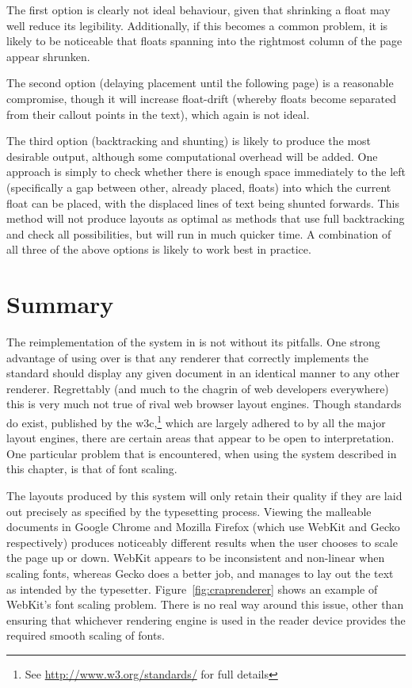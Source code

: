 The first option is clearly not ideal behaviour, given that shrinking a float may well reduce its legibility. Additionally, if this becomes a common problem, it is likely to be noticeable that floats spanning into the rightmost column of the page appear shrunken.

The second option (delaying placement until the following page) is a reasonable compromise, though it will increase float-drift (whereby floats become separated from their callout points in the text), which again is not ideal.

The third option (backtracking and shunting) is likely to produce the most desirable output, although some computational overhead will be added. One approach is simply to check whether there is enough space immediately to the left (specifically a gap between other, already placed, floats) into which the current float can be placed, with the displaced lines of text being shunted forwards. This method will not produce layouts as optimal as methods that use full backtracking and check all possibilities, but will run in much quicker time. A combination of all three of the above options is likely to work best in practice.



\section{Summary}

The reimplementation of the system in \html{} is not without its pitfalls. One strong advantage of using \pdf{} over \html{} is that any \pdf{} renderer that correctly implements the standard\hspace{0pt}\cite{ASI2001} should display any given document in an identical manner to any other renderer. Regrettably (and much to the chagrin of web developers everywhere) this is very much not true of rival web browser layout engines. Though standards do exist, published by the \gls{w3c},\footnote{See \url{http://www.w3.org/standards/} for full details} which are largely adhered to by all the major layout engines, there are certain areas that appear to be open to interpretation. One particular problem that is encountered, when using the system described in this chapter, is that of font scaling. 

The layouts produced by this system will only retain their quality if they are laid out precisely as specified by the typesetting process. Viewing the malleable documents in Google Chrome and Mozilla Firefox (which use WebKit and Gecko respectively) produces noticeably different results when the user chooses to scale the page up or down. WebKit appears to be inconsistent and non-linear when scaling fonts, whereas Gecko does a better job, and manages to lay out the text as intended by the typesetter. Figure~\ref{fig:craprenderer} shows an example of WebKit's font scaling problem. There is no real way around this issue, other than ensuring that whichever rendering engine is used in the reader device provides the required smooth scaling of fonts.

